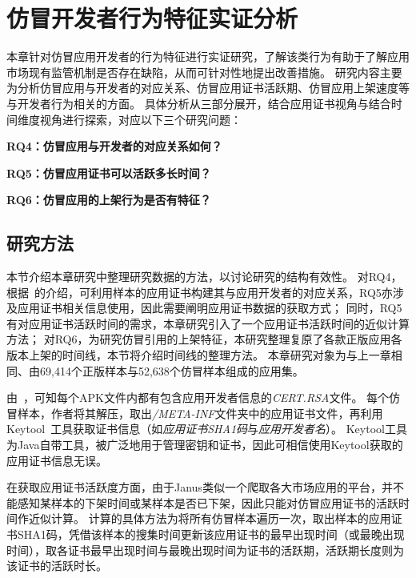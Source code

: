 \chapter{仿冒开发者行为特征实证分析}
\label{chp:discoveries_behavior}

本章针对仿冒应用开发者的行为特征进行实证研究，了解该类行为有助于了解应用市场现有监管机制是否存在缺陷，从而可针对性地提出改善措施。
研究内容主要为分析仿冒应用与开发者的对应关系、仿冒应用证书活跃期、仿冒应用上架速度等与开发者行为相关的方面。
具体分析从三部分展开，结合应用证书视角与结合时间维度视角进行探索，对应以下三个研究问题：

\textbf{ RQ4：仿冒应用与开发者的对应关系如何？}

\textbf{ RQ5：仿冒应用证书可以活跃多长时间？}

\textbf{ RQ6：仿冒应用的上架行为是否有特征？}

\section{研究方法}
\label{sec:behavior_method}

本节介绍本章研究中整理研究数据的方法，以讨论研究的结构有效性。
对RQ4，根据~的介绍，可利用样本的应用证书构建其与应用开发者的对应关系，RQ5亦涉及应用证书相关信息使用，因此需要阐明应用证书数据的获取方式；
同时，RQ5有对应用证书活跃时间的需求，本章研究引入了一个应用证书活跃时间的近似计算方法；
对RQ6，为研究仿冒引用的上架特征，本研究整理复原了各款正版应用各版本上架的时间线，本节将介绍时间线的整理方法。
本章研究对象为与上一章相同、由69,414个正版样本与52,638个仿冒样本组成的应用集。

由~，可知每个APK文件内都有包含应用开发者信息的\textit{CERT.RSA}文件。
每个仿冒样本，作者将其解压，取出\textit{/META-INF}文件夹中的应用证书文件，再利用Keytool~\cite{keytool}工具获取证书信息（如\textit{应用证书SHA1码}与\textit{应用开发者名}）。
Keytool工具为Java自带工具，被广泛地用于管理密钥和证书，因此可相信使用Keytool获取的应用证书信息无误。

在获取应用证书活跃度方面，由于Janus类似一个爬取各大市场应用的平台，并不能感知某样本的下架时间或某样本是否已下架，因此只能对仿冒应用证书的活跃时间作近似计算。
计算的具体方法为将所有仿冒样本遍历一次，取出样本的应用证书SHA1码，凭借该样本的搜集时间更新该应用证书的最早出现时间（或最晚出现时间），取各证书最早出现时间与最晚出现时间为证书的活跃期，活跃期长度则为该证书的活跃时长。

